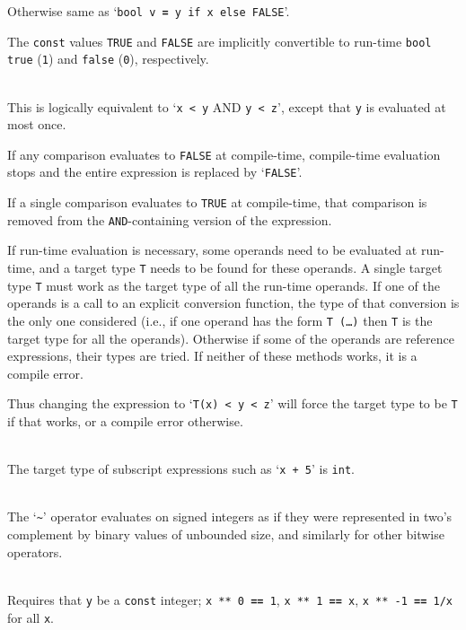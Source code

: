\documentclass[12pt]{article}
\newcommand{\TT}[1]{{\tt \bfseries #1}}
\newenvironment{indpar}[1][0.3in]%
	{\begin{list}{}%
		     {\setlength{\itemsep}{0in}%
		      \setlength{\topsep}{0in}%
		      \setlength{\parsep}{1ex}%
		      \setlength{\labelwidth}{#1}%
		      \setlength{\leftmargin}{#1}%
		      \addtolength{\leftmargin}{\labelsep}}%
	 \item}%
	{\end{list}}
\begin{document}
\begin{indpar}
      Otherwise same as `{\tt bool v \TT{=} y if x else FALSE}'.

      The {\tt const} values {\tt TRUE}
      and {\tt FALSE} are implicitly convertible to run-time {\tt bool}
      {\tt true} ({\tt 1}) and {\tt false} ({\tt 0}), respectively.

\hspace*{-0.2in}{\tt x \TT{<} y \TT{<} z} \\
      This is logically equivalent to `{\tt x < y} AND {\tt y < z}', except that
      {\tt y} is evaluated at most once.

      If any comparison evaluates to {\tt FALSE} at compile-time,
      compile-time evaluation stops and the entire expression is replaced by
      `{\tt FALSE}'.

      If a single comparison evaluates to {\tt TRUE} at compile-time,
      that comparison is removed from the {\tt AND}-containing version
      of the expression.

      If run-time evaluation is necessary,
      some operands need to be evaluated
      at run-time, and a target type {\tt T} needs to be found for
      these operands.
      A single target type {\tt T} must work as the target type of all
      the run-time operands.  If one of the operands is a call
      to an explicit conversion function, the type of that conversion
      is the only one considered (i.e., if one operand has the form
      {\tt T (\ldots)} then {\tt T} is the target type for all the
      operands).  Otherwise if some of the operands are reference expressions,
      their types are tried.  If neither of these methods works,
      it is a compile error.

      Thus changing the expression to `{\tt T(x) < y < z}' will force
      the target type to be {\tt T} if that works, or a compile
      error otherwise.

\hspace*{-0.2in}{\tt v[x+5] \TT{=} y} \\
      The target type of subscript expressions such as `{\tt x + 5}'
      is {\tt int}.

\hspace*{-0.2in}{\tt \TT{\textasciitilde} x} \\
       The `{\tt \textasciitilde}' operator
       evaluates on signed integers as if they were represented
       in two's complement by binary values of unbounded size,
       and similarly for other bitwise operators.

\hspace*{-0.2in}{\tt x \TT{**} y} \\
       Requires that {\tt y} be a {\tt const} integer;
       {\tt x ** 0 \TT{==} 1}, {\tt x ** 1 \TT{==} x},
       {\tt x ** -1 \TT{==} 1/x} for all {\tt x}.


\end{indpar}
\end{document}
